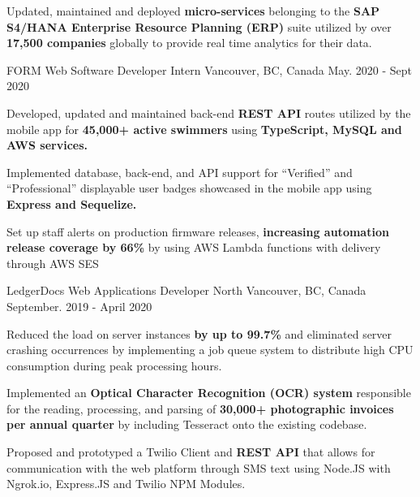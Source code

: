 \begin{cventries}
{\begin{cvitems}
       \item {Updated, maintained and deployed \textbf{micro-services} belonging to the \textbf{SAP S4/HANA Enterprise Resource Planning (ERP)} suite utilized by over \textbf{17,500 companies} globally to provide real time analytics for their data.}
      \end{cvitems}
    }    
 \cventry
    {FORM} %
    {Web Software Developer Intern} %
    {Vancouver, BC, Canada} %
    {May. 2020 - Sept 2020} %
    {
      \begin{cvitems} %
       \item {Developed, updated and maintained back-end \textbf{REST API} routes utilized by the mobile app for \textbf{45,000+ active swimmers} using \textbf{TypeScript, MySQL and AWS services.}}
       \item {Implemented database, back-end, and API support for ``Verified'' and ``Professional'' displayable user badges showcased in the mobile app using \textbf{ Express and Sequelize.}}
        \item {Set up staff alerts on production firmware releases, \textbf{increasing automation release coverage by 66\%} by using AWS Lambda functions with delivery through AWS SES}
      \end{cvitems}
    }    
\cventry
    {LedgerDocs} %
    {Web Applications Developer} %
    {North Vancouver, BC, Canada} %
    {September. 2019 - April 2020} %
    {
      \begin{cvitems} %
       \item {Reduced the load on server instances \textbf{by up to 99.7\%} and eliminated server crashing occurrences by implementing a job queue system to distribute high CPU consumption during peak processing hours.}
        \item {Implemented an \textbf{Optical Character Recognition (OCR) system} responsible for the reading, processing, and parsing of \textbf{30,000+ photographic invoices per annual quarter} by including Tesseract onto the existing codebase.}
        \item {Proposed and prototyped a Twilio Client and \textbf{REST API} that allows for communication with the web platform through SMS text using Node.JS with Ngrok.io, Express.JS and Twilio NPM Modules.}
      \end{cvitems}
    }    
     

\end{cventries}
